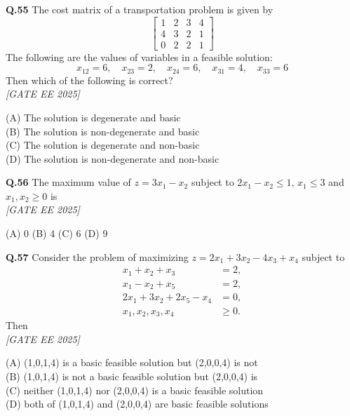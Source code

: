 \documentclass[11pt]{article}
\begin{document}
\begin{flushleft}
\textbf{Q.55} The cost matrix of a transportation problem is given by
\[
\begin{bmatrix}
1 & 2 & 3 & 4 \\
4 & 3 & 2 & 1 \\
0 & 2 & 2 & 1
\end{bmatrix}
\]
The following are the values of variables in a feasible solution:
\[
x_{12} = 6, \quad x_{23} = 2, \quad x_{24} = 6, \quad x_{31} = 4, \quad x_{33} = 6
\]
Then which of the following is correct? \\
 \textit{[GATE EE 2025]}

(A) The solution is degenerate and basic \\
(B) The solution is non-degenerate and basic \\
(C) The solution is degenerate and non-basic \\
(D) The solution is non-degenerate and non-basic
\end{flushleft}

\begin{flushleft}
\textbf{Q.56} The maximum value of $z = 3x_1 - x_2$ subject to $2x_1 - x_2 \leq 1, \, x_1 \leq 3$ and $x_1, x_2 \geq 0$ is 
\\[1ex] \textit{[GATE EE 2025]}


(A) 0 \hspace{2em} (B) 4 \hspace{2em} (C) 6 \hspace{2em} (D) 9
\end{flushleft}

\begin{flushleft}
\textbf{Q.57} Consider the problem of maximizing $z = 2x_1 + 3x_2 - 4x_3 + x_4$ subject to
\[
\begin{aligned}
x_1 + x_2 + x_3 &= 2, \\
x_1 - x_2 + x_5 &= 2, \\
2x_1 + 3x_2 + 2x_5 - x_4 &= 0, \\
x_1, x_2, x_3, x_4 &\geq 0.
\end{aligned}
\]
Then 
\\[1ex] \textit{[GATE EE 2025]}


(A) (1,0,1,4) is a basic feasible solution but (2,0,0,4) is not \\
(B) (1,0,1,4) is not a basic feasible solution but (2,0,0,4) is \\
(C) neither (1,0,1,4) nor (2,0,0,4) is a basic feasible solution \\
(D) both of (1,0,1,4) and (2,0,0,4) are basic feasible solutions
\end{flushleft}
\end{document}
